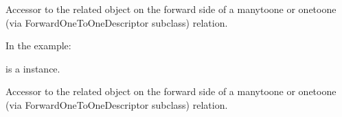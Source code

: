 \documentclass[a4paper,11pt,spanish]{sphinxmanual}
\begin{document}
\begin{fulllineitems}

\begin{fulllineitems}
\label{\detokenize{api/inventory/inventory.models:inventory.models.InventoryMovement.product}}
\pysigstartsignatures
\pysigline
{}
\pysigstopsignatures
\sphinxAtStartPar
Accessor to the related object on the forward side of a many\sphinxhyphen{}to\sphinxhyphen{}one or
one\sphinxhyphen{}to\sphinxhyphen{}one (via ForwardOneToOneDescriptor subclass) relation.

\sphinxAtStartPar
In the example:

\begin{sphinxVerbatim}[commandchars=\\\{\}]
       
\end{sphinxVerbatim}

\sphinxAtStartPar
{} is a  instance.

\end{fulllineitems}


\begin{fulllineitems}
\label{\detokenize{api/inventory/inventory.models:inventory.models.InventoryMovement.product_id}}
\pysigstartsignatures
\pysigline
{}
\pysigstopsignatures
\end{fulllineitems}


\begin{fulllineitems}
\label{\detokenize{api/inventory/inventory.models:inventory.models.InventoryMovement.proveedor}}
\pysigstartsignatures
\pysigline
{}
\pysigstopsignatures
\sphinxAtStartPar
Accessor to the related object on the forward side of a many\sphinxhyphen{}to\sphinxhyphen{}one or
one\sphinxhyphen{}to\sphinxhyphen{}one (via ForwardOneToOneDescriptor subclass) relation.


\end{fulllineitems}
\end{fulllineitems}
\end{document}
